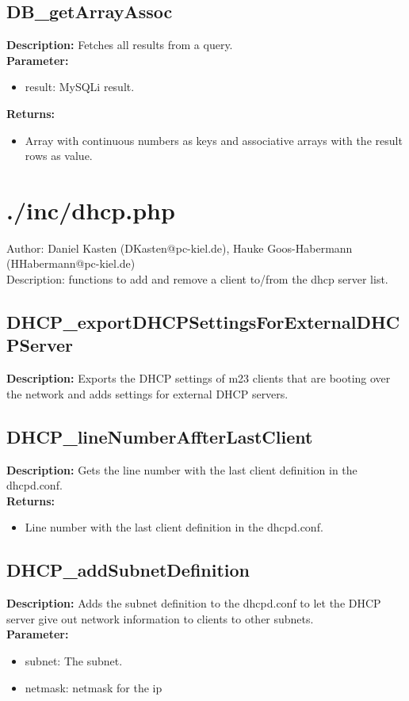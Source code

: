 \subsection{DB\_getArrayAssoc}
\textbf{Description:} Fetches all results from a query.\\
\textbf{Parameter:}
\begin{itemize}
\item result: MySQLi result.
\end{itemize}
\textbf{Returns:}
\begin{itemize}
\item Array with continuous numbers as keys and associative arrays with the result rows as value.
\end{itemize}

\newpage\section{./inc/dhcp.php}
 Author: Daniel Kasten (DKasten@pc-kiel.de), Hauke Goos-Habermann (HHabermann@pc-kiel.de)\\
 Description: functions to add and remove a client to/from the dhcp server list.\\

\subsection{DHCP\_exportDHCPSettingsForExternalDHCPServer}
\textbf{Description:} Exports the DHCP settings of m23 clients that are booting over the network and adds settings for external DHCP servers.\\

\subsection{DHCP\_lineNumberAffterLastClient}
\textbf{Description:} Gets the line number with the last client definition in the dhcpd.conf.\\
\textbf{Returns:}
\begin{itemize}
\item Line number with the last client definition in the dhcpd.conf.
\end{itemize}

\subsection{DHCP\_addSubnetDefinition}
\textbf{Description:} Adds the subnet definition to the dhcpd.conf to let the DHCP server give out network information to clients to other subnets.\\
\textbf{Parameter:}
\begin{itemize}
\item subnet: The subnet.
\item netmask: netmask for the ip
\end{itemize}

